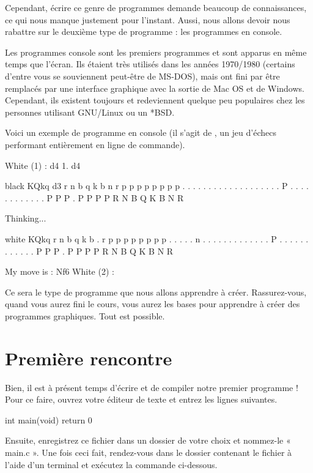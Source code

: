 Cependant, écrire ce genre de programmes demande beaucoup de
connaissances, ce qui nous manque justement pour l'instant. Aussi,
nous allons devoir nous rabattre sur le deuxième type de programme :
les programmes en console.

Les programmes console sont les premiers programmes et sont apparus en
même temps que l'écran. Ils étaient très utilisés dans les années
1970/1980 (certains d'entre vous se souviennent peut-être de MS-DOS),
mais ont fini par être remplacés par une interface graphique avec la
sortie de Mac OS et de Windows. Cependant, ils existent toujours et
redeviennent quelque peu populaires chez les personnes utilisant
GNU/Linux ou un *BSD.

Voici un exemple de programme en console (il s'agit de
, un jeu
d'échecs performant entièrement en ligne de commande).

\begin{bash}
White (1) : d4
1. d4

black  KQkq  d3
r n b q k b n r 
p p p p p p p p 
. . . . . . . . 
. . . . . . . . 
. . . P . . . . 
. . . . . . . . 
P P P . P P P P 
R N B Q K B N R 

Thinking...

white  KQkq
r n b q k b . r 
p p p p p p p p 
. . . . . n . . 
. . . . . . . . 
. . . P . . . . 
. . . . . . . . 
P P P . P P P P 
R N B Q K B N R 


My move is : Nf6
White (2) :
\end{bash}

Ce sera le type de programme que nous allons apprendre à créer.
Rassurez-vous, quand vous aurez fini le cours, vous aurez les bases
pour apprendre à créer des programmes graphiques. Tout est possible.

\section{Première rencontre}

Bien, il est à présent temps d'écrire et de compiler notre premier
programme ! Pour ce faire, ouvrez votre éditeur de texte et entrez les
lignes suivantes.

\begin{C}
  int main(void)
  {
    return 0
  }
\end{C}

Ensuite, enregistrez ce fichier dans un dossier de votre choix et
nommez-le « main.c ». Une fois ceci fait, rendez-vous dans le dossier
contenant le fichier à l'aide d'un terminal et exécutez la commande
ci-dessous.

